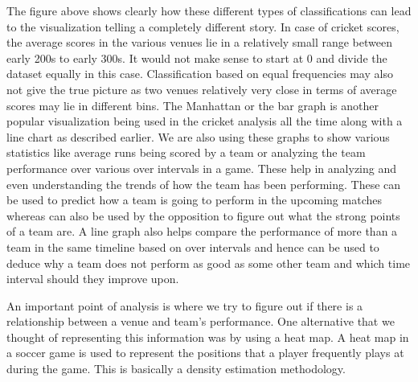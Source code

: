 \documentclass[10pt,journal,compsoc]{IEEEtran}
\begin{document}
The figure above \cite{relatedwork3} shows clearly how these different types of classifications can lead to the visualization telling a completely different story. In case of cricket scores, the average scores in the various venues lie in a relatively small range between early 200s to early 300s. It would not make sense to start at 0 and divide the dataset equally in this case. Classification based on equal frequencies may also not give the true picture as two venues relatively very close in terms of average scores may lie in different bins.
\linebreak
\linebreak
The Manhattan or the bar graph is another popular visualization being used in the cricket analysis all the time along with a line chart as described earlier. \cite{relatedwork4} We are also using these graphs to show various statistics like average runs being scored by a team or analyzing the team performance over various over intervals in a game. These help in analyzing and even understanding the trends of how the team has been performing. These can be used to predict how a team is going to perform in the upcoming matches whereas can also be used by the opposition to figure out what the strong points of a team are.\cite{relatedwork4} A line graph also helps compare the performance of more than a team in the same timeline based on over intervals and hence can be used to deduce why a team does not perform as good as some other team and which time interval should they improve upon.

\begin{figure}[H]
\begin{center}
\end{center}
\end{figure}

An important point of analysis is where we try to figure out if there is a relationship between a venue and team’s performance. One alternative that we thought of representing this information was by using a heat map. A heat map in a soccer game is used to represent the positions that a player frequently plays at during the game.\cite{relatedwork5} This is basically a density estimation methodology. 
\end{document}
